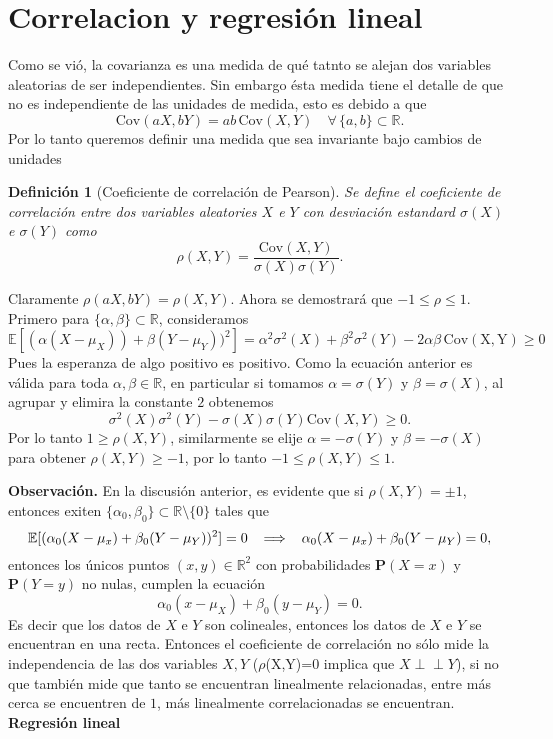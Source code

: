 \documentclass[letterpaper]{book}
\newcommand{\ind}{\perp\!\!\!\!\perp}
\newtheorem{def.}{Definici\'on}[section]
\newcommand{\prob}{\textbf{P}}
\newcommand{\esp}{\mathbb E}
\newcommand{\obs}{{\newline \noindent \sc \textbf{Observación. }}}
\newcommand{\re}{\ensuremath{\mathbb R }}
\begin{document}
\section{Correlacion y regresión lineal}
\label{sec:org812b5a0}
\noindent Como se vió, la covarianza es una medida de qué tatnto se alejan dos variables aleatorias de ser independientes. Sin embargo ésta medida tiene el detalle de que no es independiente de las unidades de medida, esto es debido a que
\[
\mathrm{Cov}(aX,bY)=ab\,\mathrm{Cov}(X,Y)\quad\forall\,\{a,b\}\subset\re.
\]
\noindent Por lo tanto queremos definir una medida que sea invariante bajo cambios de unidades
\begin{def.}[Coeficiente de correlación de Pearson]
Se define el \emph{coeficiente de correlación} entre dos variables aleatories \(X\) e \(Y\) con desviación estandard \(\sigma(X)\) e \(\sigma(Y)\) como
\[
\rho(X,Y)=\frac{\mathrm{Cov}(X,Y)}{\sigma(X)\sigma(Y)}.
\]
\end{def.}
\noindent Claramente \(\rho(aX,bY)=\rho(X,Y)\). Ahora se demostrará que \(-1\leq\rho\leq1\). Primero para \(\{\alpha,\beta\}\subset\re\), consideramos
\begin{equation}
\esp[(\alpha(X-\mu_X))+\beta(Y-\mu_Y))^2]=\alpha^2\sigma^2(X)+\beta^2\sigma^2(Y)-2\alpha\beta\,\mathrm{Cov(X,Y)}\geq 0
\end{equation}
\noindent Pues la esperanza de algo positivo es positivo. Como la ecuación anterior es válida para toda \(\alpha,\beta\in\re\), en particular si tomamos \(\alpha=\sigma(Y)\) y \(\beta=\sigma(X)\), al agrupar y elimira la constante \(2\) obtenemos
\[
\sigma^2(X)\sigma^2(Y)-\sigma(X)\sigma(Y)\mathrm{Cov}(X,Y)\geq0.
\]
\noindent Por lo tanto \(1\geq\rho(X,Y)\), similarmente se elije \(\alpha=-\sigma(Y)\) y \(\beta=-\sigma(X)\) para obtener \(\rho(X,Y)\geq-1\), por lo tanto \(-1\leq\rho(X,Y)\leq1\).

\obs En la discusión anterior, es evidente que si \(\rho(X,Y)=\pm1\), entonces exiten \(\{\alpha_0,\beta_0\}\subset\re\setminus\{0\}\) tales que
\[
\esp[(\alpha_0(X-\mu_x)+\beta_0(Y-\mu_Y))^2]=0\hspace{0.2cm}\implies\hspace{0.2cm}\alpha_0(X-\mu_x)+\beta_0(Y-\mu_Y)=0,
\]
\noindent entonces los únicos puntos \((x,y)\in\re^2\) con probabilidades \(\prob(X=x)\) y \(\prob(Y=y)\) no nulas, cumplen la ecuación
\[
\alpha_0(x-\mu_X)+\beta_0(y-\mu_Y)=0.
\]
\noindent Es decir que los datos de \(X\) e \(Y\) son colineales, entonces los datos de \(X\) e \(Y\) se encuentran en una recta. Entonces el coeficiente de correlación no sólo mide la independencia de las dos variables \(X,Y\) (\(\rho\)(X,Y)=0 implica que \(X\ind Y\)), si no que también mide que tanto se encuentran linealmente relacionadas, entre más cerca se encuentren de \(1\), más linealmente correlacionadas se encuentran.\vspace{0.5cm}
\noindent \textbf{\Large Regresión lineal}
\vspace{0.5cm}
\end{document}
